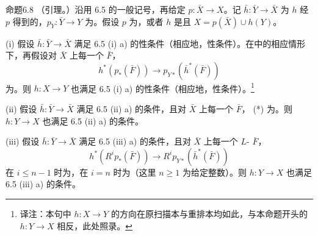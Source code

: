 \begin{SGAresult}{命题}{6.8}
（引理。）沿用 6.5 的一般记号，再给定 $p:\bar X\to X$。记 $\bar h:\bar Y\to\bar X$ 为 $h$ 经 $p$ 得到的，$p_Y:\bar Y\to Y$ 为。假设 $p$ 为，或者 $h$ 是且 $X=p(\bar X)\cup h(Y)$。

(i) 假设 $\bar h:\bar Y\to\bar X$ 满足 6.5 (i) a) 的性条件（相应地，性条件）。在中的相应情形下，再假设对 $\bar X$ 上每一个 $\bar F$，
\[
h^*(p_*(\bar F))\longrightarrow p_{Y*}(\bar h^*(\bar F))\tag{*}
\]
为。则 $h:X\to Y$ 也满足 6.5 (i) a) 的性条件（相应地，性条件）。\footnote{译注：本句中 $h:X\to Y$ 的方向在原扫描本与重排本均如此，与本命题开头的 $h:Y\to X$ 相反，此处照录。}

(ii) 假设 $\bar h:\bar Y\to\bar X$ 满足 6.5 (ii) a) 的条件，且对 $\bar X$ 上每一个 $\bar F$， (*) 为。则 $h:Y\to X$ 也满足 6.5 (ii) a) 的条件。

(iii) 假设 $\bar h:\bar Y\to\bar X$ 满足 6.5 (iii) a) 的条件，且对 $\bar X$ 上每一个 $L$- $\bar F$，
\[
h^*(R^ip_*(\bar F))\longrightarrow R^ip_{Y*}(\bar h^*(\bar F))
\]
在 $i\leq n-1$ 时为，在 $i=n$ 时为（这里 $n\geq1$ 为给定整数）。则 $h:Y\to X$ 也满足 6.5 (iii) a) 的条件。
\end{SGAresult}

